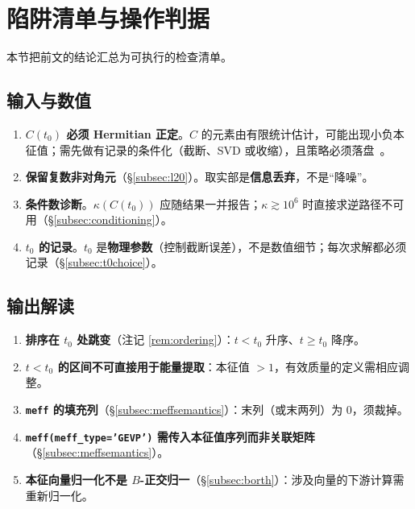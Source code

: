 \documentclass[12pt,a4paper]{ctexart}
\theoremstyle{definition}
\newcommand{\code}[1]{\texttt{#1}}
\begin{document}
\section{陷阱清单与操作判据}\label{sec:pitfalls}

本节把前文的结论汇总为可执行的检查清单。

\subsection{输入与数值}

\begin{enumerate}[nosep]
    \item \textbf{$C(t_0)$ 必须 Hermitian 正定}。$C$ 的元素由有限统计估计，可能出现小负本征值；需先做有记录的条件化（截断、SVD 或收缩），且策略必须落盘~\cite{pyqcdStatistics}。
    \item \textbf{保留复数非对角元}（§\ref{subsec:l20}）。取实部是\textbf{信息丢弃}，不是``降噪''。
    \item \textbf{条件数诊断}。$\kappa(C(t_0))$ 应随结果一并报告；$\kappa\gtrsim10^{6}$ 时直接求逆路径不可用（§\ref{subsec:conditioning}）。
    \item \textbf{$t_0$ 的记录}。$t_0$ 是\textbf{物理参数}（控制截断误差），不是数值细节；每次求解都必须记录（§\ref{subsec:t0choice}）。
\end{enumerate}

\subsection{输出解读}

\begin{enumerate}[nosep]
    \item \textbf{排序在 $t_0$ 处跳变}（注记 \ref{rem:ordering}）：$t<t_0$ 升序、$t\ge t_0$ 降序。
    \item \textbf{$t<t_0$ 的区间不可直接用于能量提取}：本征值 $>1$，有效质量的定义需相应调整。
    \item \textbf{\code{meff} 的填充列}（§\ref{subsec:meffsemantics}）：末列（或末两列）为 0，须裁掉。
    \item \textbf{\code{meff(meff\_type='GEVP')} 需传入本征值序列而非关联矩阵}（§\ref{subsec:meffsemantics}）。
    \item \textbf{本征向量归一化不是 $B$-正交归一}（§\ref{subsec:borth}）：涉及向量的下游计算需重新归一化。
\end{enumerate}
\end{document}
